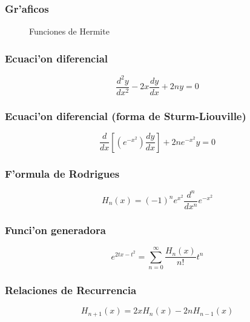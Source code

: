 \subsubsection{Gr'aficos}
\begin{figure}[!h]
\centerline{}
\caption{Funciones de Hermite}
\end{figure}

\subsubsection{Ecuaci'on diferencial}

\begin{equation}
\frac{d^{2}y}{dx^{2}}-2x\frac{dy}{dx}+2ny=0
\end{equation}

\subsubsection{Ecuaci'on diferencial (forma de Sturm-Liouville)}

\begin{equation}
\frac{d}{dx}\left[\left( e^{-x^{2}}\right)\frac{dy}{dx}\right]+2ne^{-x^{2}}y=0
\end{equation}

\subsubsection{F'ormula de Rodrigues}

\begin{equation}
H_{n}(x)=(-1)^{n}e^{x^{2}}\frac{d^{n}}{dx^{n}}e^{-x^{2}}
\end{equation}

\subsubsection{Funci'on generadora}

\begin{equation}
e^{2tx-t^{2}}=\sum_{n=0}^{\infty}\frac{H_{n}(x)}{n!}t^{n}
\end{equation}

\subsubsection{Relaciones de Recurrencia}

\begin{equation}
H_{n+1}(x)=2xH_{n}(x)-2nH_{n-1}(x)
\end{equation}

